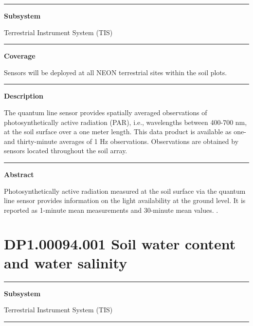 \documentclass[]{article}
\begin{document}
\begin{center}\rule{0.5\linewidth}{\linethickness}\end{center}

\textbf{Subsystem}

Terrestrial Instrument System (TIS)

\begin{center}\rule{0.5\linewidth}{\linethickness}\end{center}

\textbf{Coverage}

Sensors will be deployed at all NEON terrestrial sites within the soil
plots.

\begin{center}\rule{0.5\linewidth}{\linethickness}\end{center}

\textbf{Description}

The quantum line sensor provides spatially averaged observations of
photosynthetically active radiation (PAR), i.e., wavelengths between
400-700 nm, at the soil surface over a one meter length. This data
product is available as one- and thirty-minute averages of 1 Hz
observations. Observations are obtained by sensors located throughout
the soil array.

\begin{center}\rule{0.5\linewidth}{\linethickness}\end{center}

\textbf{Abstract}

Photosynthetically active radiation measured at the soil surface via the
quantum line sensor provides information on the light availability at
the ground level. It is reported as 1-minute mean measurements and
30-minute mean values. \newpage
.

\section{DP1.00094.001 Soil water content and water
salinity}\label{dp1.00094.001-soil-water-content-and-water-salinity}

\begin{center}\rule{0.5\linewidth}{\linethickness}\end{center}

\textbf{Subsystem}

Terrestrial Instrument System (TIS)

\begin{center}\rule{0.5\linewidth}{\linethickness}\end{center}
\end{document}
